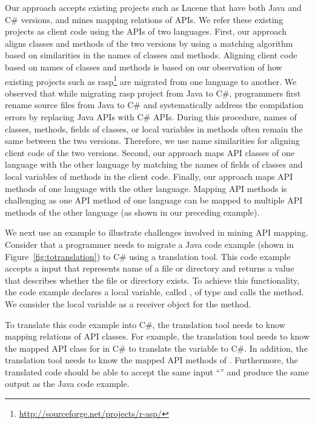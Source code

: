 Our approach accepts existing projects such as Lucene that have both
Java and C\# versions, and mines mapping relations of APIs. We refer
these existing projects as client code using the APIs of two
languages. First, our approach aligns classes and methods of the two
versions by using a matching algorithm based on similarities in the
names of classes and methods. Aligning client code based on names of
classes and methods is based on our observation of how existing
projects such as
rasp\footnote{\url{http://sourceforge.net/projects/r-asp/}} are
migrated from one language to another. We observed that while
migrating rasp project from Java to C\#, programmers first rename
source files from Java to C\# and systematically address the
compilation errors by replacing Java APIs with C\# APIs. During this
procedure, names of classes, methods, fields of classes, or local
variables in methods often remain the same between the two versions.
Therefore, we use name similarities for aligning client code of the
two versions. Second, our approach maps API classes of one language
with the other language by matching the names of fields of classes
and local variables of methods in the client code. Finally, our
approach maps API methods of one language with the other language.
Mapping API methods is challenging as one API method of one language
can be mapped to multiple API methods of the other language (as
shown in our preceding example).


We next use an example to illustrate challenges involved in
mining API mapping. Consider that a programmer needs to migrate
a Java code example (shown in Figure~\ref{fig:totranslation}) to C\# using a translation tool.
This code example accepts a  input that represents
name of a file or directory and returns a  value that
describes whether the file or directory exists. To achieve this functionality,
the code example declares a local variable, called ,
of type  and calls the  method.
We consider the local variable  as a receiver object for
the  method.

To translate this code example into C\#, the translation
tool needs to know mapping relations of API classes. For example,
the translation tool needs to know the mapped API class for 
in C\# to translate the variable  to C\#. In addition, the translation tool needs
to know the mapped API methods of . Furthermore,
the translated code should be able to accept the same input
``'' and produce the same output as the Java code example.


